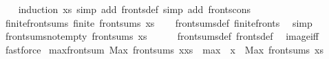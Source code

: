 \begin{isabellebody}
%
\isadelimproof
\ \ %
\endisadelimproof
%
\isatagproof
{}\isamarkupfalse%
\ {\isacharparenleft}{\kern0pt}induction\ xs{\isacharparenright}{\kern0pt}\ {\isacharparenleft}{\kern0pt}simp\ add{\isacharcolon}{\kern0pt}\ fronts{\isacharunderscore}{\kern0pt}def{\isacharcomma}{\kern0pt}\ simp\ add{\isacharcolon}{\kern0pt}\ fronts{\isacharunderscore}{\kern0pt}cons{\isacharparenright}{\kern0pt}%
\endisatagproof
{\isafoldproof}%
%
\isadelimproof
\isanewline
%
\endisadelimproof
\isanewline
{}\isamarkupfalse%
\ finite{\isacharunderscore}{\kern0pt}front{\isacharunderscore}{\kern0pt}sums{\isacharcolon}{\kern0pt}\ {\isachardoublequoteopen}finite\ {\isacharparenleft}{\kern0pt}front{\isacharunderscore}{\kern0pt}sums\ xs{\isacharparenright}{\kern0pt}{\isachardoublequoteclose}\isanewline
%
\isadelimproof
\ \ %
\endisadelimproof
%
\isatagproof
{}\isamarkupfalse%
\ front{\isacharunderscore}{\kern0pt}sums{\isacharunderscore}{\kern0pt}def\ finite{\isacharunderscore}{\kern0pt}fronts\ \isamarkupfalse%
\ simp%
\endisatagproof
{\isafoldproof}%
%
\isadelimproof
\isanewline
%
\endisadelimproof
\isanewline
{}\isamarkupfalse%
\ front{\isacharunderscore}{\kern0pt}sums{\isacharunderscore}{\kern0pt}not{\isacharunderscore}{\kern0pt}empty{\isacharcolon}{\kern0pt}\ {\isachardoublequoteopen}front{\isacharunderscore}{\kern0pt}sums\ xs\ {\isasymnoteq}\ {\isacharbraceleft}{\kern0pt}{\isacharbraceright}{\kern0pt}{\isachardoublequoteclose}\isanewline
%
\isadelimproof
\ \ %
\endisadelimproof
%
\isatagproof
{}\isamarkupfalse%
\ front{\isacharunderscore}{\kern0pt}sums{\isacharunderscore}{\kern0pt}def\ fronts{\isacharunderscore}{\kern0pt}def\ \isamarkupfalse%
\ image{\isacharunderscore}{\kern0pt}iff\ \isamarkupfalse%
\ fastforce%
\endisatagproof
{\isafoldproof}%
%
\isadelimproof
\isanewline
%
\endisadelimproof
\isanewline
{}\isamarkupfalse%
\ max{\isacharunderscore}{\kern0pt}front{\isacharunderscore}{\kern0pt}sum{\isacharcolon}{\kern0pt}\ {\isachardoublequoteopen}Max\ {\isacharparenleft}{\kern0pt}front{\isacharunderscore}{\kern0pt}sums\ {\isacharparenleft}{\kern0pt}x{\isacharhash}{\kern0pt}xs{\isacharparenright}{\kern0pt}{\isacharparenright}{\kern0pt}\ {\isacharequal}{\kern0pt}\ max\ {}\ {\isacharparenleft}{\kern0pt}x\ {\isacharplus}{\kern0pt}\ Max\ {\isacharparenleft}{\kern0pt}front{\isacharunderscore}{\kern0pt}sums\ xs{\isacharparenright}{\kern0pt}{\isacharparenright}{\kern0pt}{\isachardoublequoteclose}\isanewline
%
\isadelimproof
%
\endisadelimproof

\end{isabellebody}
